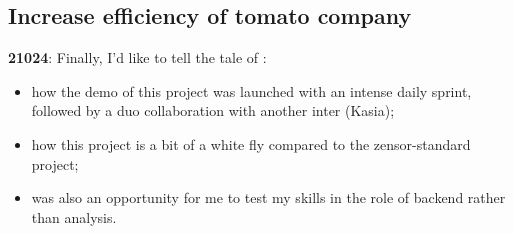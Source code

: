 \subsection{Increase efficiency of tomato company}
\textbf{21024}: Finally, I'd like to tell the tale of \cite{Misc:stoffels_en_website}:
\begin{itemize}
    \item how the demo of this project was launched with an intense daily sprint, followed by a duo collaboration with another inter (Kasia);
    \item how this project is a bit of a white fly compared to the zensor-standard project;
    \item  was also an opportunity for me to test my skills in the role of backend rather than analysis.
\end{itemize}
